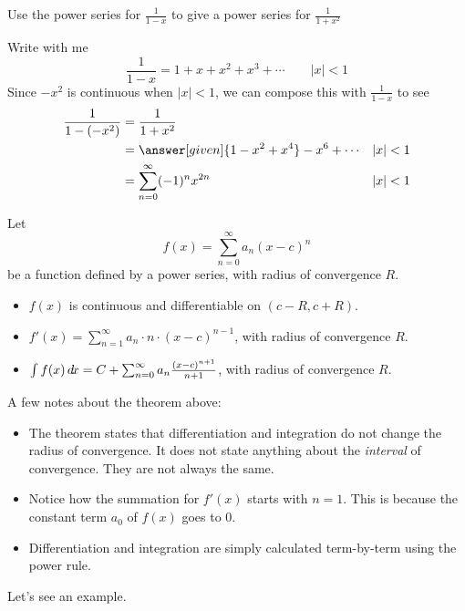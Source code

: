 \documentclass{ximera}
\begin{document}
\begin{example}
  Use the power series for $\frac{1}{1-x}$ to give a power series for $\frac{1}{1+x^2}$
  \begin{explanation}
    Write with me
    \[
    \frac{1}{1-x}= 1+ x+ x^2 + x^3 + \cdots\qquad|x|< 1
    \]
    Since $-x^2$ is continuous when $|x|<1$, we can compose this with $\frac{1}{1-x}$ to see
    \begin{align*}
    \frac{1}{1-(-x^2)} &=\frac{1}{1+x^2}\\
    &= \answer[given]{1 - x^2 + x^4} - x^6 + \cdots &|x|< 1\\
    &= \sum_{n=0}^\infty (-1)^n x^{2n} &|x|< 1
    \end{align*}
  \end{explanation}
\end{example}

\begin{theorem}
  Let
  \[
  f(x) = \sum_{n=0}^\infty a_n(x-c)^n
  \]
  be a function defined by a power series, with radius of convergence $R$.
  \begin{itemize}
  \item $f(x)$ is continuous and differentiable on $(c-R,c+R)$.
  \item	$f'(x) = \sum_{n=1}^\infty a_n\cdot n\cdot (x-c)^{n-1}$, with radius of convergence $R$.
  \item	$\int f(x) \mathop{}\!d\! x = C+\sum_{n=0}^\infty a_n\frac{(x-c)^{n+1}}{n+1}$, with radius of convergence $R$.
  \end{itemize}
\end{theorem}

A few notes about the theorem above:
\begin{itemize}
\item The theorem states that differentiation and integration do not
  change the radius of convergence. It does not state anything about
  the \textit{interval} of convergence. They are not always the same.
\item Notice how the summation for $f'(x)$ starts with $n=1$. This is
  because the constant term $a_0$ of $f(x)$ goes to $0$.
\item Differentiation and integration are simply calculated
  term-by-term using the power rule.
\end{itemize}

Let's see an example.
\end{document}
